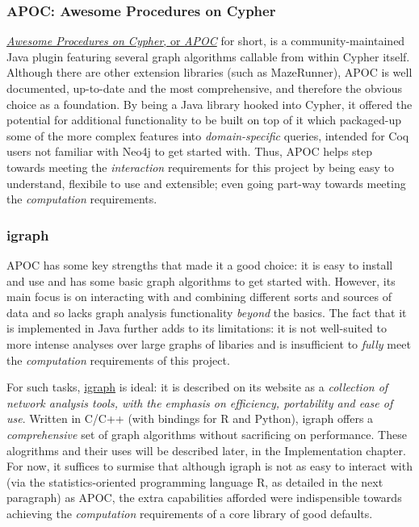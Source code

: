 \subsubsection{APOC: Awesome Procedures on Cypher}

\href{http://github.com/neo4j-contrib/neo4j-apoc-procedures}{\emph{Awesome
Procedures on Cypher}, or \emph{APOC}} for short, is a community-maintained Java
plugin featuring several graph algorithms callable from within Cypher itself.
Although there are other extension libraries (such as MazeRunner), APOC is well
documented, up-to-date and the most comprehensive, and therefore the obvious
choice as a foundation. By being a Java library hooked into Cypher, it offered
the potential for additional functionality to be built on top of it which
packaged-up some of the more complex features into \emph{domain-specific}
queries, intended for Coq users not familiar with Neo4j to get started with.
Thus, APOC helps step towards meeting the \emph{interaction} requirements for
this project by being easy to understand, flexibile to use and extensible; even
going part-way towards meeting the \emph{computation} requirements.

\subsubsection{igraph}\label{subsubsec:neo4jtoolsigraph}

APOC has some key strengths that made it a good choice: it is easy to install
and use and has some basic graph algorithms to get started with.  However, its
main focus is on interacting with and combining different sorts and sources of
data and so lacks graph analysis functionality \emph{beyond} the basics. The
fact that it is implemented in Java further adds to its limitations: it is not
well-suited to more intense analyses over large graphs of libaries and is
insufficient to \emph{fully} meet the \emph{computation} requirements of this
project.

For such tasks, \href{http://www.igraph.org}{igraph} is ideal: it is described
on its website as a \emph{collection of network analysis tools, with the
emphasis on efficiency, portability and ease of use}. Written in C/C++ (with
bindings for R and Python), igraph offers a \emph{comprehensive} set of graph
algorithms without sacrificing on performance. These alogrithms and their uses
will be described later, in the Implementation chapter. For now, it suffices to
surmise that although igraph is not as easy to interact with (via the
statistics-oriented programming language R, as detailed in the next paragraph)
as APOC, the extra capabilities afforded were indispensible towards achieving
the \emph{computation} requirements of a core library of good defaults.

